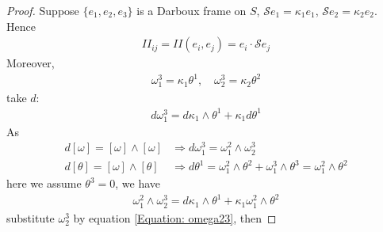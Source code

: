 \documentclass[10pt]{article}
\begin{document}
            \begin{proof}
                Suppose $\{e_1, e_2, e_3\}$ is a Darboux frame on $S$, $\mathcal{S}e_1=\kappa_1e_1$, $\mathcal{S}e_2=\kappa_2e_2$. Hence
                \begin{equation*}
                    \begin{aligned}
                        II_{ij} = II(e_i, e_j) = e_i\cdot\mathcal{S}e_j
                    \end{aligned}
                \end{equation*}
                Moreover, 
                \begin{equation}\label{Equation: omega23}
                    \begin{aligned}
                        \omega_1^3 = \kappa_1\theta^1, \quad \omega_2^3 = \kappa_2\theta^2
                    \end{aligned}
                \end{equation}
                take $d$:
                \begin{equation*}
                    \begin{aligned}
                        d\omega_1^3 = d\kappa_1\wedge\theta^1 + \kappa_1 d\theta^1
                    \end{aligned}
                \end{equation*}
                As
                \begin{equation*}
                    \begin{aligned}
                        d[\omega] = [\omega]\wedge[\omega]&\Longrightarrow d\omega_1^3 = \omega_1^2\wedge\omega_2^3 \\ 
                        d[\theta] = [\omega]\wedge[\theta]&\Longrightarrow d\theta^1 = \omega_1^2\wedge\theta^2 + \omega_1^3\wedge\theta^3 = \omega_1^2\wedge\theta^2
                    \end{aligned}
                \end{equation*}
                here we assume $\theta^3 = 0$, we have
                \begin{equation*}
                    \begin{aligned}
                        \omega_1^2\wedge\omega_2^3 = d\kappa_1\wedge\theta^1 + \kappa_1 \omega_1^2\wedge\theta^2
                    \end{aligned}
                \end{equation*}
                substitute $\omega_2^3$ by equation \eqref{Equation: omega23}, then

\end{proof}
\end{document}
